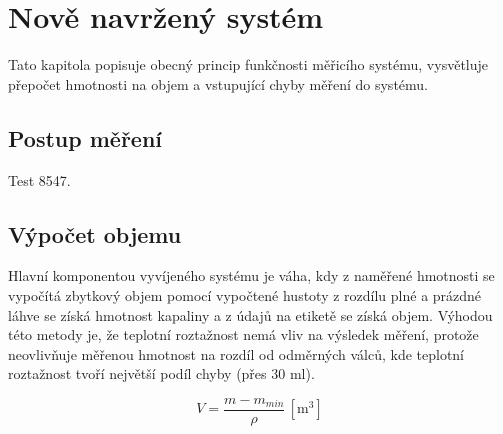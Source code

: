 






\chapter{Nově navržený systém}
Tato kapitola popisuje obecný princip funkčnosti měřicího systému, vysvětluje přepočet hmotnosti na objem a vstupující chyby měření do systému.

\section{Postup měření}

Test 8547.

\section{Výpočet objemu}
Hlavní komponentou vyvíjeného systému je váha, kdy z naměřené hmotnosti se vypočítá zbytkový objem pomocí vypočtené hustoty z rozdílu plné a prázdné láhve se získá hmotnost kapaliny a z údajů na etiketě se získá objem. Výhodou této metody je, že teplotní roztažnost nemá vliv na výsledek měření, protože neovlivňuje měřenou hmotnost na rozdíl od odměrných válců, kde teplotní roztažnost tvoří největší podíl chyby (přes 30 ml).


\begin{equation}
    V = \frac{m - m_{min}}{\rho} \, \left[\mathrm{m^3}\right] \label{objem_kapalina}
\end{equation}

